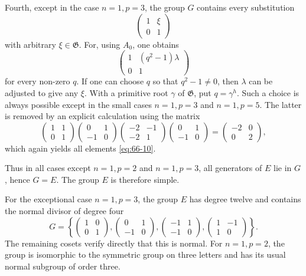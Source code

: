 \documentclass[11pt]{article}
\begin{document}
Fourth, except in the case \(n=1,p=3\), the group \(G\) contains every substitution
\begin{equation}\label{eq:66-10}
 \begin{pmatrix}1&\xi\\0&1\end{pmatrix}
\end{equation}
with arbitrary \(\xi\in\mathfrak G\).  For, using \(A_0\), one obtains
\begin{equation}\label{eq:66-11}
 \begin{pmatrix}1&(q^2-1)\lambda\\0&1\end{pmatrix}
\end{equation}
for every non-zero \(q\).  If one can choose \(q\) so that \(q^2-1\ne0\), then \(\lambda\) can be adjusted to give any \(\xi\).  With a primitive root \(\gamma\) of \(\mathfrak G\), put \(q=\gamma^h\).  Such a choice is always possible except in the small cases \(n=1,p=3\) and \(n=1,p=5\).  The latter is removed by an explicit calculation using the matrix
\[
 \begin{pmatrix}1&1\\0&1\end{pmatrix}
 \begin{pmatrix}0&1\\-1&0\end{pmatrix}
 \begin{pmatrix}-2&-1\\-2&1\end{pmatrix}
 \begin{pmatrix}0&1\\-1&0\end{pmatrix}
 =
 \begin{pmatrix}-2&0\\0&2\end{pmatrix},
\]
which again yields all elements \eqref{eq:66-10}.

Thus in all cases except \(n=1,p=2\) and \(n=1,p=3\), all generators of \(E\) lie in \(G\), hence \(G=E\).  The group \(E\) is therefore simple.

For the exceptional case \(n=1,p=3\), the group \(E\) has degree twelve and contains the normal divisor of degree four
\begin{equation}\label{eq:66-exception3}
 G=\left\{
 \begin{pmatrix}1&0\\0&1\end{pmatrix},
 \begin{pmatrix}0&1\\-1&0\end{pmatrix},
 \begin{pmatrix}-1&1\\-1&0\end{pmatrix},
 \begin{pmatrix}1&-1\\1&0\end{pmatrix}
 \right\}.
\end{equation}
The remaining cosets verify directly that this is normal.  For \(n=1,p=2\), the group is isomorphic to the symmetric group on three letters and has its usual normal subgroup of order three.
\end{document}
